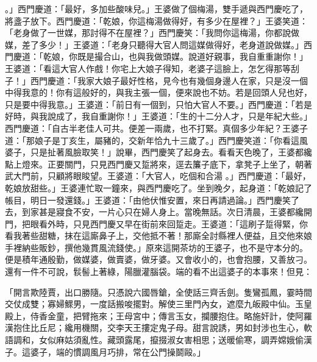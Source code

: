 。」西門慶道：「最好，多加些酸味兒。」王婆做了個梅湯，雙手遞與西門慶吃了，將盞子放下。西門慶道：「乾娘，你這梅湯做得好，有多少在屋裡？」王婆笑道：「老身做了一世媒，那討得不在屋裡？」西門慶笑：「我問你這梅湯，你都說做媒，差了多少！」王婆道：「老身只聽得大官人問這媒做得好，老身道說做媒。」西門慶道：「乾娘，你既是撮合山，也與我做頭媒。說道好親事，我自重重謝你！」王婆道：「看這大官人作戲！你宅上大娘子得知，老婆子這臉上，怎乞得那等刮子！」西門慶道：「我家大娘子最好性格，見今也有幾個身邊人在家，只是沒一個中得我意的！你有這般好的，與我主張一個，便來說也不妨。若是回頭人兒也好，只是要中得我意。」王婆道：「前日有一個到，只怕大官人不要。」西門慶道：「若是好時，與我說成了，我自重謝你！」王婆道：「生的十二分人才，只是年紀大些。」西門慶道：「自古半老佳人可共。便差一兩歲，也不打緊。真個多少年紀？王婆子道：「那娘子是丁亥生，屬豬的，交新年恰九十三歲了。」西門慶笑道：「你看這風婆子，只是扯著風臉取笑！」說畢，西門慶笑了起身去。看看天色晚了，王婆都纔點上燈來。正要關門，只見西門慶又踅將來，逕去簾子底下，拿凳子上坐了，朝著武大門前，只顧將眼睃望。王婆道：「大官人，吃個和合湯 。」西門慶道：「最好，乾娘放甜些。」王婆連忙取一鐘來，與西門慶吃了。坐到晚夕，起身道：「乾娘記了帳目，明日一發還錢。」王婆道：「由他伏惟安置，來日再請過論。」西門慶笑了去，到家甚是寢食不安，一片心只在婦人身上。當晚無話。次日清晨，王婆都纔開門，把眼看外時，只見西門慶又早在街前來回踅走。王婆道：「這刷子踅得緊，你看我著些甜糖，抹在這廝鼻子上，交他抵不著！那廝全討縣裡人便益，且交他來娘手裡納些販鈔，撰他幾貫風流錢使。」原來這開茶坊的王婆子，也不是守本分的。便是積年通殷勤，做媒婆，做賣婆，做牙婆。又會收小的，也會抱腰，又善放刁。還有一件不可說，䯼髻上著綠，陽臘灌腦袋。端的看不出這婆子的本事來！但見：

「開言欺陸賈，出口勝隨。只憑說六國唇鎗，全使話三齊舌劍。隻鸞孤鳳，霎時間交仗成雙；寡婦鰥男，一度話搬唆擺對。解使三里門內女，遮麼九皈殿中仙。玉皇殿上，侍香金童，把臂拖來；王母宮中；傳言玉女，攔腰抱住。略施奸計，使阿羅漢抱住比丘尼；纔用機關，交李天王摟定鬼子母。甜言說誘，男如封涉也生心，軟語調和，女似麻姑須亂性。藏頭露尾，攛掇淑女害相思；送暖偷寒，調弄嫦娥偷漢子。這婆子，端的慣調風月巧排，常在公門操鬬毆。」

